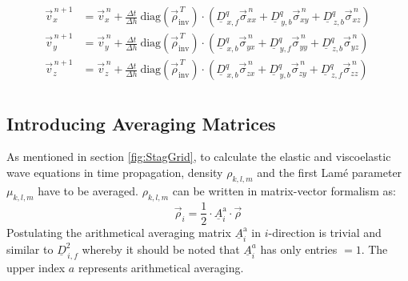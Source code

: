 \documentclass[pdftex,a4paper,parskip,listof=totoc,bibliography=totoc,onehalfspacing,12pt]{scrreprt}
\begin{document}
\begin{align*}
	\vec{v}_x^{\,n+1} &= \vec{v}_x^{\,n} + \frac{\Delta t}{\Delta h} ~ \mathrm{diag} \left( \vec{\rho}_\mathrm{inv}^{\,T} \right) \cdot \left( \underline{D}_{\,x,f}^q \vec{\sigma}_{xx}^{\,n} + \underline{D}_{\,y,b}^q \vec{\sigma}_{xy}^{\,n} + \underline{D}_{\,z,b}^q \vec{\sigma}_{xz}^{\,n} \right)\\
	\vec{v}_y^{\,n+1} &= \vec{v}_y^{\,n} + \frac{\Delta t}{\Delta h} ~ \mathrm{diag} \left( \vec{\rho}_\mathrm{inv}^{\,T} \right) \cdot \left( \underline{D}_{\,x,b}^q \vec{\sigma}_{yx}^{\,n} + \underline{D}_{\,y,f}^q \vec{\sigma}_{yy}^{\,n} + \underline{D}_{\,z,b}^q \vec{\sigma}_{yz}^{\,n} \right)\\
	\vec{v}_z^{\,n+1} &= \vec{v}_z^{\,n} + \frac{\Delta t}{\Delta h} ~ \mathrm{diag} \left( \vec{\rho}_\mathrm{inv}^{\,T} \right) \cdot \left( \underline{D}_{\,x,b}^q \vec{\sigma}_{zx}^{\,n} + \underline{D}_{\,y,b}^q \vec{\sigma}_{zy}^{\,n} + \underline{D}_{\,z,f}^q \vec{\sigma}_{zz}^{\,n} \right)\\
\end{align*}

\subsection{Introducing Averaging Matrices}
As mentioned in section \ref{fig:StagGrid}, to calculate the elastic and viscoelastic wave equations in time propagation, density $\rho_{k,l,m}$ and the first Lam\'{e} parameter $\mu_{k,l,m}$ have to be averaged. $\rho_{k,l,m}$ can be written in matrix-vector formalism as:
\begin{equation*}
\vec{\rho}_{i}=\frac{1}{2}\cdot\underline{A}^{\text{a}}_{i} \cdot\vec{\rho}	
\end{equation*}
Postulating the arithmetical averaging matrix $\underline{A}^{\text{a}}_{i}$ in $i$-direction is trivial and similar to $\underline{D}_{\,i,f}^2$ whereby it should be noted that $\underline{A}^{a}_{i}$ has only entries $=1$. The upper index $a$ represents arithmetical averaging.
\end{document}
